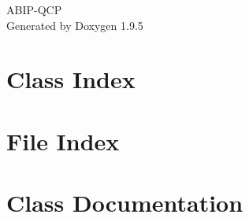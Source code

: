 \documentclass[twoside]{book}
\newcommand{\+}{\discretionary{\mbox{\scriptsize$\hookleftarrow$}}{}{}}
\newcommand{\clearemptydoublepage}{%
    \newpage{\pagestyle{empty}\cleardoublepage}%
  }
\begin{document}
  \raggedbottom
    \hypersetup{pageanchor=false,
                bookmarksnumbered=true,
                pdfencoding=unicode
               }
  \begin{titlepage}
  \vspace*{7cm}
  \begin{center}%
  {\Large ABIP-\/\+QCP}\\
  \vspace*{1cm}
  {\large Generated by Doxygen 1.9.5}\\
  \end{center}
  \end{titlepage}
  \clearemptydoublepage
  \tableofcontents
  \clearemptydoublepage
  \hypersetup{pageanchor=true}
\chapter{Class Index}

\chapter{File Index}

\chapter{Class Documentation}



















\end{document}
